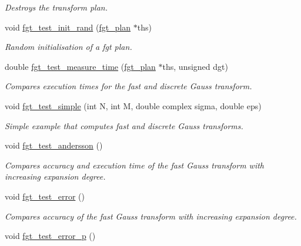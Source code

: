 \begin{CompactItemize}
\begin{CompactList}\small\item\em Destroys the transform plan. \item\end{CompactList}\item 
void \hyperlink{group__applications__fastgauss_ga6}{fgt\_\-test\_\-init\_\-rand} (\hyperlink{structfgt__plan}{fgt\_\-plan} $\ast$ths)
\begin{CompactList}\small\item\em Random initialisation of a fgt plan. \item\end{CompactList}\item 
double \hyperlink{group__applications__fastgauss_ga7}{fgt\_\-test\_\-measure\_\-time} (\hyperlink{structfgt__plan}{fgt\_\-plan} $\ast$ths, unsigned dgt)
\begin{CompactList}\small\item\em Compares execution times for the fast and discrete Gauss transform. \item\end{CompactList}\item 
void \hyperlink{group__applications__fastgauss_ga8}{fgt\_\-test\_\-simple} (int N, int M, double complex sigma, double eps)
\begin{CompactList}\small\item\em Simple example that computes fast and discrete Gauss transforms. \item\end{CompactList}\item 
void \hyperlink{group__applications__fastgauss_ga9}{fgt\_\-test\_\-andersson} ()
\begin{CompactList}\small\item\em Compares accuracy and execution time of the fast Gauss transform with increasing expansion degree. \item\end{CompactList}\item 
void \hyperlink{group__applications__fastgauss_ga10}{fgt\_\-test\_\-error} ()
\begin{CompactList}\small\item\em Compares accuracy of the fast Gauss transform with increasing expansion degree. \item\end{CompactList}\item 
void \hyperlink{group__applications__fastgauss_ga11}{fgt\_\-test\_\-error\_\-p} ()

\end{CompactItemize}
